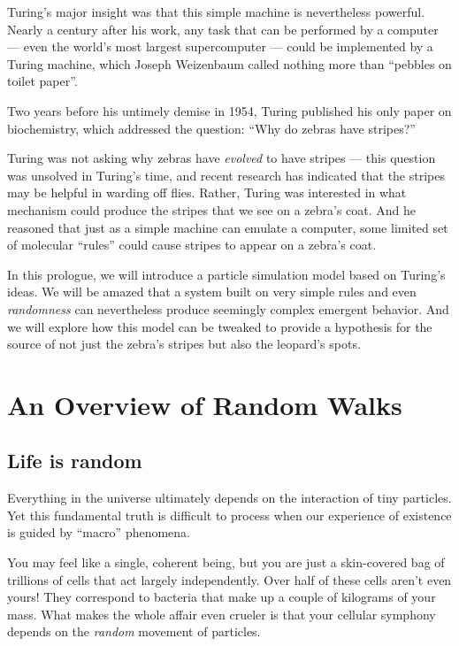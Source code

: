 Turing's major insight was that this simple machine is nevertheless powerful. Nearly a century after his work, any task that can be performed by a computer --- even the world's most largest supercomputer --- could be implemented by a Turing machine, which Joseph Weizenbaum called nothing more than ``pebbles on toilet paper''.

Two years before his untimely demise in 1954, Turing published his only paper on biochemistry, which addressed the question: “Why do zebras have stripes?”

Turing was not asking why zebras have \textit{evolved} to have stripes --- this question was unsolved in Turing's time, and recent research has indicated that the stripes may be helpful in warding off flies. Rather, Turing was interested in what mechanism could produce the stripes that we see on a zebra's coat. And he reasoned that just as a simple machine can emulate a computer, some limited set of molecular ``rules'' could cause stripes to appear on a zebra's coat.

In this prologue, we will introduce a particle simulation model based on Turing's ideas. We will be amazed that a system built on very simple rules and even \textit{randomness} can nevertheless produce seemingly complex emergent behavior. And we will explore how this model can be tweaked to provide a hypothesis for the source of not just the zebra's stripes but also the leopard's spots.

\FloatBarrier
{}

\section{An Overview of Random Walks}
\label{sec:an_overview_of_random_walks}

\subsection{Life is random}

Everything in the universe ultimately depends on the interaction of tiny particles. Yet this fundamental truth is difficult to process when our experience of existence is guided by ``macro'' phenomena.

You may feel like a single, coherent being, but you are just a skin-covered bag of trillions of cells that act largely independently. Over half of these cells aren't even yours! They correspond to bacteria that make up a couple of kilograms of your mass. What makes the whole affair even crueler is that your cellular symphony depends on the \textit{random} movement of particles.

